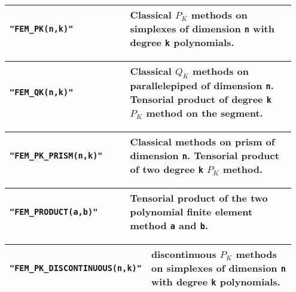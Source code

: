 \begin{center} \begin{tabular}{|m{0.40\linewidth}|m{0.55\linewidth}|} \hline
{\tt "FEM\_PK(n,k)"} & Classical $P_K$ methods on simplexes of dimension  {\tt n} with degree {\tt k} polynomials.\\ \hline
\end{tabular}  
\begin{tabular}{|m{0.40\linewidth}|m{0.55\linewidth}|} \hline
{\tt "FEM\_QK(n,k)"} & Classical $Q_K$ methods on parallelepiped of dimension {\tt n}. Tensorial product of degree {\tt k} $P_K$ method on the segment. \\ \hline
\end{tabular}  
\begin{tabular}{|m{0.40\linewidth}|m{0.55\linewidth}|} \hline
{\tt "FEM\_PK\_PRISM(n,k)"} & Classical methods on prism of dimension {\tt n}. Tensorial product of two degree {\tt k} $P_K$ method. \\ \hline
\end{tabular}  
\begin{tabular}{|m{0.40\linewidth}|m{0.55\linewidth}|} \hline
{\tt "FEM\_PRODUCT(a,b)"} & Tensorial product of the two polynomial finite element method {\tt a} and {\tt b}. \\ \hline
\end{tabular}   
\begin{tabular}{|m{0.40\linewidth}|m{0.55\linewidth}|} \hline
{\tt "FEM\_PK\_DISCONTINUOUS(n,k)"} & discontinuous $P_K$ methods on simplexes of dimension  {\tt n} with degree {\tt k} polynomials. \\ \hline
\end{tabular}  
\end{center}
